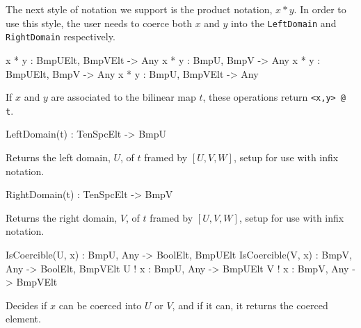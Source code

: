 The next style of notation we support is the product notation, $x*y$. In order
to use this style, the user needs to coerce both $x$ and $y$ into the
\texttt{LeftDomain} and \texttt{RightDomain} respectively. 

\begin{intrinsics}
x * y : BmpUElt, BmpVElt -> Any
x * y : BmpU, BmpV -> Any
x * y : BmpUElt, BmpV -> Any
x * y : BmpU, BmpVElt -> Any
\end{intrinsics}

If $x$ and $y$ are associated to the bilinear map $t$, these operations return 
\texttt{<x,y> @ t}.

\begin{intrinsics}
LeftDomain(t) : TenSpcElt -> BmpU
\end{intrinsics}

Returns the left domain, $U$, of $t$ framed by $[U,V,W]$, 
setup for use with infix notation.

\begin{intrinsics}
RightDomain(t) : TenSpcElt -> BmpV
\end{intrinsics}

Returns the right domain, $V$, of $t$ framed by $[U,V,W]$,
setup for use with infix notation.

\begin{intrinsics}
IsCoercible(U, x) : BmpU, Any -> BoolElt, BmpUElt
IsCoercible(V, x) : BmpV, Any -> BoolElt, BmpVElt
U ! x : BmpU, Any -> BmpUElt
V ! x : BmpV, Any -> BmpVElt
\end{intrinsics}

Decides if $x$ can be coerced into $U$ or $V$, and if it can, it returns the coerced element.

